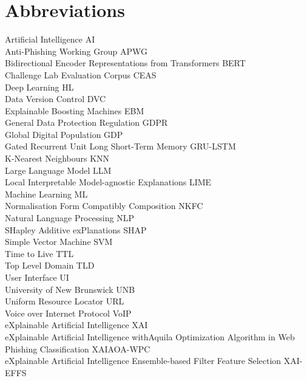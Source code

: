 
\section*{Abbreviations}

\large
Artificial Intelligence \hfill AI\\
Anti-Phishing Working Group \hfill APWG\\
Bidirectional Encoder Representations from Transformers \hfill BERT\\
Challenge Lab Evaluation Corpus \hfill CEAS\\
Deep Learning \hfill HL\\
Data Version Control \hfill DVC\\
Explainable Boosting Machines \hfill EBM\\
General Data Protection Regulation \hfill GDPR\\
Global Digital Population \hfill GDP\\
Gated Recurrent Unit Long Short-Term Memory \hfill GRU-LSTM\\
K-Nearest Neighbours \hfill KNN\\
Large Language Model \hfill LLM\\
Local Interpretable Model-agnostic Explanations \hfill LIME\\
Machine Learning \hfill ML\\
Normalisation Form Compatibly Composition \hfill NKFC\\
Natural Language Processing \hfill NLP \\
SHapley Additive exPlanations \hfill SHAP\\
Simple Vector Machine \hfill SVM\\
Time to Live \hfill TTL\\
Top Level Domain \hfill TLD\\
User Interface \hfill UI\\
University of New Brunswick \hfill UNB\\
Uniform Resource Locator \hfill URL\\
Voice over Internet Protocol \hfill VoIP\\
eXplainable Artificial Intelligence \hfill XAI\\
eXplainable Artificial Intelligence with\newline Aquila Optimization Algorithm in Web Phishing Classification \hfill XAIAOA-WPC\\
eXplainable Artificial Intelligence Ensemble-based Filter Feature Selection \hfill XAI-EFFS\\
